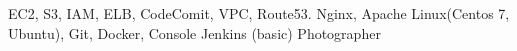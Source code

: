
\begin{keywords}
	 {EC2, S3, IAM, ELB, CodeComit, VPC, Route53.}
	 {Nginx, Apache}
	 {Linux(Centos 7, Ubuntu), Git, Docker, Console}
	 {Jenkins (basic)}
	 {Photographer}
\end{keywords}
